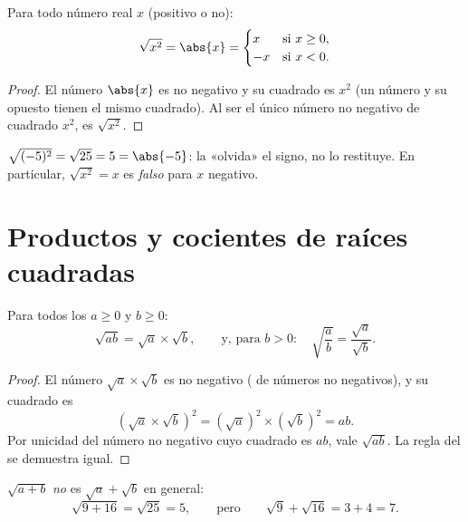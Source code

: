 \begin{proposition}\label{prop:g9:sqrt:square}
Para todo número real $x$ (positivo o no):
\[
\sqrt{x^2} = \abs{x} =
\begin{cases}
x & \text{si } x \geq 0,\\
-x & \text{si } x < 0 .
\end{cases}
\]
\end{proposition}

\begin{proof}
El número $\abs{x}$ es no negativo y su cuadrado es $x^2$ (un número y
su opuesto tienen el mismo cuadrado). Al ser el único número no negativo
de cuadrado $x^2$, es $\sqrt{x^2}$.
\end{proof}

\begin{example}
$\sqrt{(-5)^2} = \sqrt{25} = 5 = \abs{-5}$: la  «olvida»
el signo, no lo restituye. En particular, $\sqrt{x^2} = x$ es
\emph{falso} para $x$ negativo.
\end{example}

\section{Productos y cocientes de raíces cuadradas}

\begin{theorem}\label{thm:g9:sqrt:rules}
Para todos los $a \geq 0$ y $b \geq 0$:
\[
\sqrt{a b} = \sqrt a \times \sqrt b,
\qquad\text{y, para } b > 0:\quad
\sqrt{\frac ab} = \frac{\sqrt a}{\sqrt b} .
\]
\end{theorem}

\begin{proof}
El número $\sqrt a \times \sqrt b$ es no negativo ( de
números no negativos), y su cuadrado es
\[
\left(\sqrt a \times \sqrt b\right)^2
= \left(\sqrt a\right)^2 \times \left(\sqrt b\right)^2
= a b .
\]
Por unicidad del número no negativo cuyo cuadrado es $ab$, vale
$\sqrt{ab}$. La regla del  se demuestra igual.
\end{proof}

\begin{remark}
$\sqrt{a + b}$ \emph{no} es $\sqrt a + \sqrt b$ en general:
\[
\sqrt{9 + 16} = \sqrt{25} = 5,
\qquad\text{pero}\qquad
\sqrt 9 + \sqrt{16} = 3 + 4 = 7 .
\]
\end{remark}

